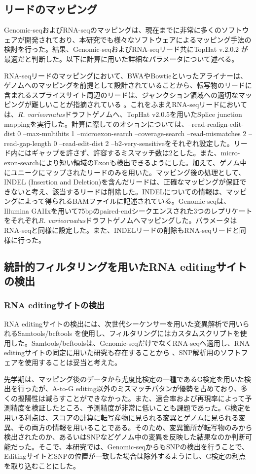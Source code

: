 \subsection{リードのマッピング}
Genomic-seqおよびRNA-seqのマッピングは、現在までに非常に多くのソフトウェアが開発されており、本研究でも様々なソフトウェアによるマッピング手法の検討を行った。結果、Genomic-seqおよびRNA-seqリード共にTopHat v.2.0.2 \citep{pmid19289445}が最適だと判断した。以下に計算に用いた詳細なパラメータについて述べる。
\par
RNA-seqリードのマッピングにおいて、BWAやBowtieといったアライナーは、ゲノムへのマッピングを前提として設計されていることから、転写物のリードに含まれるスプライスサイト周辺のリードは、ジャンクション領域への適切なマッピングが難しいことが指摘されている \citep{pmid22383036}。これをふまえRNA-seqリードにおいては、{\it R. varieornatus}ドラフトゲノムへ、TopHat v2.0.5を用いたSplice junction mappingを実行した。計算に際してのオションについては、--read-realign-edit-dist 0 --max-multihits 1 --microexon-search --coverage-search --read-mismatches 2 --read-gap-length 0 --read-edit-dist 2 --b2-very-sensitiveをそれぞれ設定した。リード内にはギャップを許さず、許容するミスマッチ数は2とした。また、micro-exon-searchにより短い領域のExonも検出できるようにした。加えて、ゲノム中にユニークにマップされたリードのみを用いた。マッピング後の処理として、INDEL (Insertion and Deletion)を含んだリードは、正確なマッピングが保証できないと考え、該当するリードは削除した。INDELについての情報は、マッピングによって得られるBAMファイルに記述されている。Genomic-seqは、Illumina GAIIxを用いて75bpのpaired-endシークエンスされた3つのレプリケートをそれぞれ{\it R. varieornatus}ドラフトゲノムへマッピングした。パラメータはRNA-seqと同様に設定した。また、INDELリードの削除もRNA-seqリードと同様に行った。

\subsection{統計的フィルタリングを用いたRNA editingサイトの検出}
\subsubsection{RNA editingサイトの検出}
RNA editingサイトの検出には、次世代シーケンサーを用いた変異解析で用いられるSamtools/bcftools \citep{pmid21903627}を使用し、フィルタリングにはカスタムスクリプトを使用した。Samtools/bcftoolsは、Genomic-seqだけでなくRNA-seqへ適用し、RNA editingサイトの同定に用いた研究も存在することから \citep{pmid22524474}、SNP解析用のソフトフェアを使用することは妥当と考えた。
\par
先学期は、マッピング後のデータから尤度比検定の一種であるG検定を用いた検出を行ったが、A-to-G editing以外のミスマッチパタンが優勢を占めており、多くの擬陽性は減らすことができなかった。また、適合率および再現率によって予測精度を検証したところ、予測精度が非常に低いことも課題であった。G検定を用いる利点は、スコアの計算に転写産物に見られる変異とゲノムに見られる変異、その両方の情報を用いることである。そのため、変異箇所が転写物のみから検出されたのか、あるいはSNPなどゲノム中の変異を反映した結果なのか判断可能だった。そこで、本研究では、Genomic-seqからもSNPの検出を行うことで、EditingサイトとSNPの位置が一致した場合は除外するようにし、G検定の利点を取り込むことにした。

